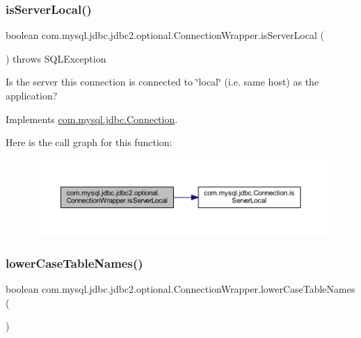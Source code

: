 \subsubsection{\texorpdfstring{is\+Server\+Local()}{isServerLocal()}}
{\footnotesize\ttfamily boolean com.\+mysql.\+jdbc.\+jdbc2.\+optional.\+Connection\+Wrapper.\+is\+Server\+Local (\begin{DoxyParamCaption}{ }\end{DoxyParamCaption}) throws S\+Q\+L\+Exception}

Is the server this connection is connected to \char`\"{}local\char`\"{} (i.\+e. same host) as the application? 

Implements \mbox{\hyperlink{interfacecom_1_1mysql_1_1jdbc_1_1_connection_a37eb25137505b9aaf4b25a847f87e949}{com.\+mysql.\+jdbc.\+Connection}}.

Here is the call graph for this function\+:
\nopagebreak
\begin{figure}[H]
\begin{center}
\leavevmode
\includegraphics[width=350pt]{classcom_1_1mysql_1_1jdbc_1_1jdbc2_1_1optional_1_1_connection_wrapper_a7361ebd235ec5eb1608231e3b9d4eb36_cgraph}
\end{center}
\end{figure}
\mbox{\label{classcom_1_1mysql_1_1jdbc_1_1jdbc2_1_1optional_1_1_connection_wrapper_a1c95dda9f599a78aef9acb5cf854b99b}} 
\subsubsection{\texorpdfstring{lower\+Case\+Table\+Names()}{lowerCaseTableNames()}}
{\footnotesize\ttfamily boolean com.\+mysql.\+jdbc.\+jdbc2.\+optional.\+Connection\+Wrapper.\+lower\+Case\+Table\+Names (\begin{DoxyParamCaption}{ }\end{DoxyParamCaption})}

